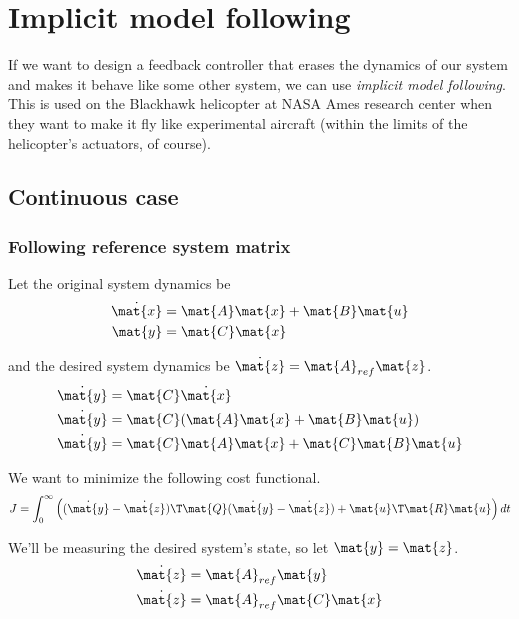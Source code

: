 \section{Implicit model following}
\label{sec:implicit_model_following}

If we want to design a feedback controller that erases the dynamics of our
system and makes it behave like some other system, we can use \textit{implicit
model following}. This is used on the Blackhawk helicopter at NASA Ames research
center when they want to make it fly like experimental aircraft (within the
limits of the helicopter's actuators, of course).

\subsection{Continuous case}

\subsubsection{Following reference system matrix}

Let the original system dynamics be
\begin{align*}
  \dot{\mat{x}} &= \mat{A}\mat{x} + \mat{B}\mat{u} \\
  \mat{y} &= \mat{C}\mat{x}
\end{align*}

and the desired system dynamics be $\dot{\mat{z}} = \mat{A}_{ref}\mat{z}$.
\begin{align*}
  \dot{\mat{y}} &= \mat{C}\dot{\mat{x}} \\
  \dot{\mat{y}} &= \mat{C}(\mat{A}\mat{x} + \mat{B}\mat{u}) \\
  \dot{\mat{y}} &= \mat{C}\mat{A}\mat{x} + \mat{C}\mat{B}\mat{u}
\end{align*}

We want to minimize the following cost functional.
\begin{equation*}
  J = \int_0^\infty \left((\dot{\mat{y}} - \dot{\mat{z}})\T \mat{Q}
    (\dot{\mat{y}} - \dot{\mat{z}}) + \mat{u}\T\mat{R}\mat{u}\right) dt
\end{equation*}

We'll be measuring the desired system's state, so let $\mat{y} = \mat{z}$.
\begin{align*}
  \dot{\mat{z}} &= \mat{A}_{ref}\mat{y} \\
  \dot{\mat{z}} &= \mat{A}_{ref}\mat{C}\mat{x}
\end{align*}

